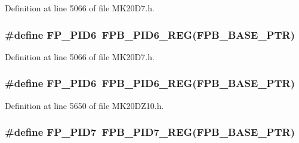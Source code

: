 Definition at line 5066 of file M\+K20\+D7.\+h.

\subsubsection[{\texorpdfstring{F\+P\+\_\+\+P\+I\+D6}{FP_PID6}}]{\setlength{\rightskip}{0pt plus 5cm}\#define F\+P\+\_\+\+P\+I\+D6~{\bf F\+P\+B\+\_\+\+P\+I\+D6\+\_\+\+R\+EG}({\bf F\+P\+B\+\_\+\+B\+A\+S\+E\+\_\+\+P\+TR})}\hypertarget{group___f_p_b___register___accessor___macros_ga76fcd3f55c4ee8a9c6dda02c17106bab}{}\label{group___f_p_b___register___accessor___macros_ga76fcd3f55c4ee8a9c6dda02c17106bab}


Definition at line 5066 of file M\+K20\+D7.\+h.

\subsubsection[{\texorpdfstring{F\+P\+\_\+\+P\+I\+D6}{FP_PID6}}]{\setlength{\rightskip}{0pt plus 5cm}\#define F\+P\+\_\+\+P\+I\+D6~{\bf F\+P\+B\+\_\+\+P\+I\+D6\+\_\+\+R\+EG}({\bf F\+P\+B\+\_\+\+B\+A\+S\+E\+\_\+\+P\+TR})}\hypertarget{group___f_p_b___register___accessor___macros_ga76fcd3f55c4ee8a9c6dda02c17106bab}{}\label{group___f_p_b___register___accessor___macros_ga76fcd3f55c4ee8a9c6dda02c17106bab}


Definition at line 5650 of file M\+K20\+D\+Z10.\+h.

\subsubsection[{\texorpdfstring{F\+P\+\_\+\+P\+I\+D7}{FP_PID7}}]{\setlength{\rightskip}{0pt plus 5cm}\#define F\+P\+\_\+\+P\+I\+D7~{\bf F\+P\+B\+\_\+\+P\+I\+D7\+\_\+\+R\+EG}({\bf F\+P\+B\+\_\+\+B\+A\+S\+E\+\_\+\+P\+TR})}\hypertarget{group___f_p_b___register___accessor___macros_ga8774270b6bf61764eb807be046bafa2d}{}\label{group___f_p_b___register___accessor___macros_ga8774270b6bf61764eb807be046bafa2d}


